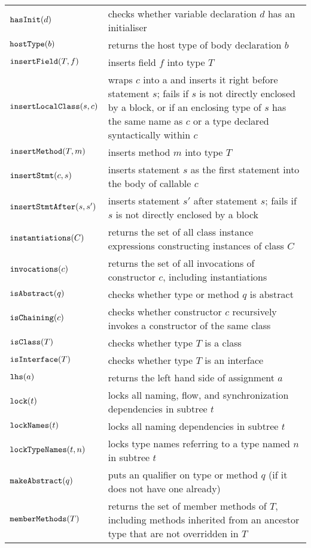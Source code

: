 \begin{center}
\begin{supertabular}{|l|p{10cm}|}
$\text{\texttt{hasInit}}(d)$ & checks whether variable declaration $d$ has an initialiser \\
$\text{\texttt{hostType}}(b)$ & returns the host type of body declaration $b$ \\
$\text{\texttt{insertField}}(T, f)$ & inserts field $f$ into type $T$ \\
$\text{\texttt{insertLocalClass}}(s, c)$ & wraps $c$ into a  and inserts it right before statement $s$; fails if $s$ is not directly enclosed by a block, or if an enclosing type of $s$ has the same name as $c$ or a type declared syntactically within $c$ \\
$\text{\texttt{insertMethod}}(T, m)$ & inserts method $m$ into type $T$ \\
$\text{\texttt{insertStmt}}(c, s)$ & inserts statement $s$ as the first statement into the body of callable $c$ \\
$\text{\texttt{insertStmtAfter}}(s, s')$ & inserts statement $s'$ after statement $s$; fails if $s$ is not directly enclosed by a block \\
$\text{\texttt{instantiations}}(C)$ & returns the set of all class instance expressions constructing instances of class $C$ \\
$\text{\texttt{invocations}}(c)$ & returns the set of all invocations of constructor $c$, including instantiations\\
$\text{\texttt{isAbstract}}(q)$ & checks whether type or method $q$ is abstract \\
$\text{\texttt{isChaining}}(c)$ & checks whether constructor $c$ recursively invokes a constructor of the same class \\
$\text{\texttt{isClass}}(T)$ & checks whether type $T$ is a class \\
$\text{\texttt{isInterface}}(T)$ & checks whether type $T$ is an interface \\
$\text{\texttt{lhs}}(a)$ & returns the left hand side of assignment $a$ \\
$\text{\texttt{lock}}(t)$ & locks all naming, flow, and synchronization dependencies in subtree $t$ \\
$\text{\texttt{lockNames}}(t)$ & locks all naming dependencies in subtree $t$ \\
$\text{\texttt{lockTypeNames}}(t, n)$ & locks type names referring to a type named $n$ in subtree $t$ \\
$\text{\texttt{makeAbstract}}(q)$ & puts an  qualifier on type or method $q$ (if it does not have one already) \\
$\text{\texttt{memberMethods}}(T)$ & returns the set of member methods of $T$, including methods inherited from an ancestor type that are not overridden in $T$ \\

\end{supertabular}
\end{center}
